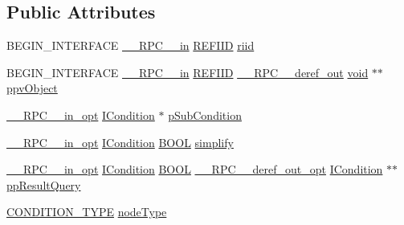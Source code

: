 \subsection*{Public Attributes}
\begin{DoxyCompactItemize}
\item 
B\+E\+G\+I\+N\+\_\+\+I\+N\+T\+E\+R\+F\+A\+CE \hyperlink{rpcsal_8h_a20b7f6da600a05c8b541659f14f7f0e6}{\+\_\+\+\_\+\+R\+P\+C\+\_\+\+\_\+in} \hyperlink{px__win__ds_8c_a80ec49c8ae61e234197d5071d2df497d}{R\+E\+F\+I\+ID} \hyperlink{struct_i_condition_factory_vtbl_a9c81f731130db6da4f82bcf7aebc7119}{riid}
\item 
B\+E\+G\+I\+N\+\_\+\+I\+N\+T\+E\+R\+F\+A\+CE \hyperlink{rpcsal_8h_a20b7f6da600a05c8b541659f14f7f0e6}{\+\_\+\+\_\+\+R\+P\+C\+\_\+\+\_\+in} \hyperlink{px__win__ds_8c_a80ec49c8ae61e234197d5071d2df497d}{R\+E\+F\+I\+ID} \hyperlink{rpcsal_8h_a23bc188526f10656f9c79d950f6c3192}{\+\_\+\+\_\+\+R\+P\+C\+\_\+\+\_\+deref\+\_\+out} \hyperlink{sound_8c_ae35f5844602719cf66324f4de2a658b3}{void} $\ast$$\ast$ \hyperlink{struct_i_condition_factory_vtbl_aad57780a80b1734b4bf7172636a94e1c}{ppv\+Object}
\item 
\hyperlink{rpcsal_8h_a6e152ac84637d70f0453366759b3b9fb}{\+\_\+\+\_\+\+R\+P\+C\+\_\+\+\_\+in\+\_\+opt} \hyperlink{structuredquery_8h_a44e1be344248ef67d647837c4aae42fa}{I\+Condition} $\ast$ \hyperlink{struct_i_condition_factory_vtbl_a913c1c3e188201729e5f7623c7074c04}{p\+Sub\+Condition}
\item 
\hyperlink{rpcsal_8h_a6e152ac84637d70f0453366759b3b9fb}{\+\_\+\+\_\+\+R\+P\+C\+\_\+\+\_\+in\+\_\+opt} \hyperlink{structuredquery_8h_a44e1be344248ef67d647837c4aae42fa}{I\+Condition} \hyperlink{nfilterkit_8h_a3be13892ae7076009afcf121347dd319}{B\+O\+OL} \hyperlink{struct_i_condition_factory_vtbl_a31111fb36b67ccbc13aac8136c3ca313}{simplify}
\item 
\hyperlink{rpcsal_8h_a6e152ac84637d70f0453366759b3b9fb}{\+\_\+\+\_\+\+R\+P\+C\+\_\+\+\_\+in\+\_\+opt} \hyperlink{structuredquery_8h_a44e1be344248ef67d647837c4aae42fa}{I\+Condition} \hyperlink{nfilterkit_8h_a3be13892ae7076009afcf121347dd319}{B\+O\+OL} \hyperlink{rpcsal_8h_ab29e89ceb0eb0b075c6f6299b0de6a21}{\+\_\+\+\_\+\+R\+P\+C\+\_\+\+\_\+deref\+\_\+out\+\_\+opt} \hyperlink{structuredquery_8h_a44e1be344248ef67d647837c4aae42fa}{I\+Condition} $\ast$$\ast$ \hyperlink{struct_i_condition_factory_vtbl_aa1146445d38a978d13d440ea7f677222}{pp\+Result\+Query}
\item 
\hyperlink{structuredquery_8h_afbbe55e1cea689df1b4eadd5be61ca43}{C\+O\+N\+D\+I\+T\+I\+O\+N\+\_\+\+T\+Y\+PE} \hyperlink{struct_i_condition_factory_vtbl_a7aba74e62b85e7e73ecef2a22e4976f8}{node\+Type}

\end{DoxyCompactItemize}
